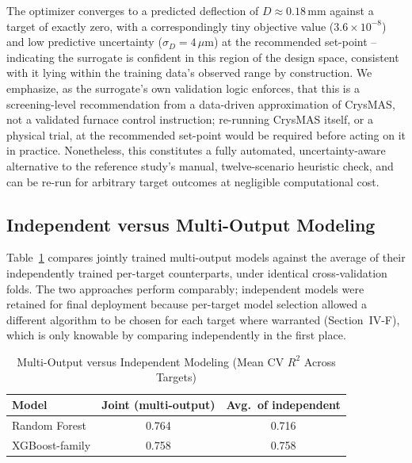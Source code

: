 \documentclass[conference]{IEEEtran}
\begin{document}
The optimizer converges to a predicted deflection of $D\approx0.18\,$mm against a target of exactly zero, with a correspondingly tiny objective value ($3.6\times10^{-8}$) and low predictive uncertainty ($\sigma_D=4\,\mu$m) at the recommended set-point -- indicating the surrogate is confident in this region of the design space, consistent with it lying within the training data's observed range by construction. We emphasize, as the surrogate's own validation logic enforces, that this is a screening-level recommendation from a data-driven approximation of CrysMAS, not a validated furnace control instruction; re-running CrysMAS itself, or a physical trial, at the recommended set-point would be required before acting on it in practice. Nonetheless, this constitutes a fully automated, uncertainty-aware alternative to the reference study's manual, twelve-scenario heuristic check, and can be re-run for arbitrary target outcomes at negligible computational cost.

\subsection{Independent versus Multi-Output Modeling}
Table~\ref{tab:multioutput} compares jointly trained multi-output models against the average of their independently trained per-target counterparts, under identical cross-validation folds. The two approaches perform comparably; independent models were retained for final deployment because per-target model selection allowed a different algorithm to be chosen for each target where warranted (Section~IV-F), which is only knowable by comparing independently in the first place.

\begin{table}[!t]
\caption{Multi-Output versus Independent Modeling (Mean CV $R^2$ Across Targets)}
\label{tab:multioutput}
\centering
\footnotesize
\setlength{\tabcolsep}{3pt}
\begin{tabular}{@{}lcc@{}}
\toprule
\textbf{Model} & \textbf{Joint (multi-output)} & \textbf{Avg.\ of independent} \\
\midrule
Random Forest & 0.764 & 0.716 \\
XGBoost-family & 0.758 & 0.758 \\
\bottomrule
\end{tabular}
\end{table}

\end{document}
